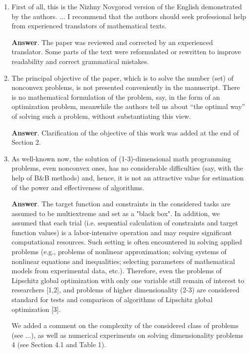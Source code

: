 \documentclass{article}%
\begin{document}
\begin{enumerate}
\item
First of all, this is the Nizhny Novgorod version of the English demonstrated by the authors. ... I recommend that the authors should seek professional help from experienced translators of mathematical texts.

\textbf{Answer}.
The paper was reviewed and corrected by an experienced translator. Some parts of the text were reformulated or rewritten to improve readability and correct grammatical mistakes. 

\item The principal objective of the paper, which is to solve the number (set) of nonconvex problems, is not presented conveniently in the manuscript. There is no mathematical formulation of the problem, say, in the form of an optimization problem, meanwhile the authors tell us about “the optimal way” of solving such a problem, without substantiating this view.

\textbf{Answer}.
Clarification of the objective of this work was added at the end of Section 2.

\item As well-known now, the solution of (1-3)-dimensional math programming problems, even nonconvex ones, has no considerable difficulties (say, with the help of B\&B methods) and, hence, it is not an attractive value for estimation of the power and effectiveness of algorithms.

\textbf{Answer}.
The target function and constraints in the considered tasks are assumed to be multiextreme and set as a "black box". In addition, we assumed that each trial (i.e. sequential calculation of constraints and target function values) is a labor-intensive operation and may require significant computational resources. Such setting is often encountered in solving applied problems (e.g., problems of nonlinear approximation; solving systems of nonlinear equations and inequalities; selecting parameters of mathematical models from experimental data, etc.). Therefore, even the problems of Lipschitz global optimization with only one variable still remain of interest to researchers [1,2], and problems of higher dimensionality (2-3) are considered standard for tests and comparison of algorithms of Lipschitz  global optimization [3].

We added a comment on the complexity of the considered class of problems (see ...), as well as numerical experiments on solving dimensionality problems 4 (see Section 4.1 and Table 1).


\end{enumerate}
\end{document}
